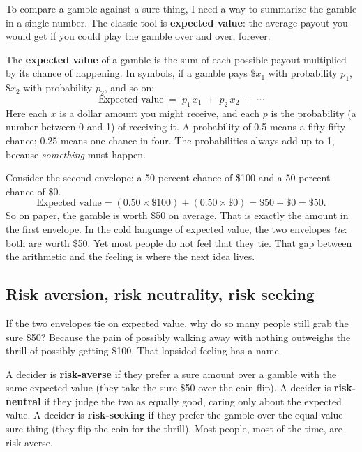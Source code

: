 \documentclass[11pt]{article}
\newcommand{\term}[1]{\textbf{\color{mossdk}#1}}
\begin{document}
To compare a gamble against a sure thing, I need a way to summarize the gamble in a single number. The
classic tool is \term{expected value}: the average payout you would get if you could play the gamble
over and over, forever.

\begin{defbox}
The \term{expected value} of a gamble is the sum of each possible payout multiplied by its chance of
happening. In symbols, if a gamble pays \$$x_1$ with probability $p_1$, \$$x_2$ with probability
$p_2$, and so on:
\[
\text{Expected value} \;=\; p_1 \, x_1 \;+\; p_2 \, x_2 \;+\; \cdots
\]
Here each $x$ is a dollar amount you might receive, and each $p$ is the probability (a number between
0 and 1) of receiving it. A probability of 0.5 means a fifty-fifty chance; 0.25 means one chance in
four. The probabilities always add up to 1, because \emph{something} must happen.
\end{defbox}

\begin{workbox}
Consider the second envelope: a 50 percent chance of \$100 and a 50 percent chance of \$0.
\[
\text{Expected value} = (0.50 \times \$100) + (0.50 \times \$0) = \$50 + \$0 = \$50.
\]
So on paper, the gamble is worth \$50 on average. That is exactly the amount in the first envelope. In
the cold language of expected value, the two envelopes \emph{tie}: both are worth \$50. Yet most people
do not feel that they tie. That gap between the arithmetic and the feeling is where the next idea lives.
\end{workbox}

\subsection{Risk aversion, risk neutrality, risk seeking}

If the two envelopes tie on expected value, why do so many people still grab the sure \$50? Because
the pain of possibly walking away with nothing outweighs the thrill of possibly getting \$100. That
lopsided feeling has a name.

\begin{defbox}
A decider is \term{risk-averse} if they prefer a sure amount over a gamble with the same expected
value (they take the sure \$50 over the coin flip). A decider is \term{risk-neutral} if they judge
the two as equally good, caring only about the expected value. A decider is \term{risk-seeking} if
they prefer the gamble over the equal-value sure thing (they flip the coin for the thrill). Most
people, most of the time, are risk-averse.
\end{defbox}
\end{document}
